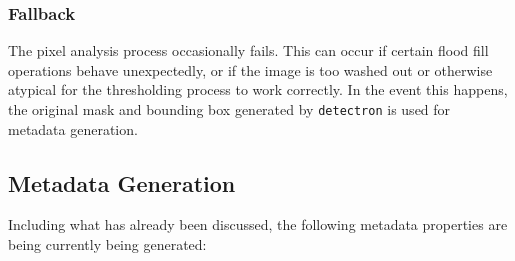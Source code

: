\documentclass[screen,review]{acmart}
\begin{document}
\subsubsection{Fallback} The pixel analysis process occasionally fails. This can occur if certain flood fill operations behave unexpectedly, or if the image is too washed out or otherwise atypical for the thresholding process to work correctly. In the event this happens, the original mask and bounding box generated by \verb|detectron| is used for metadata generation.
\subsection{Metadata Generation}
Including what has already been discussed, the following metadata properties are being currently being generated:
\end{document}
